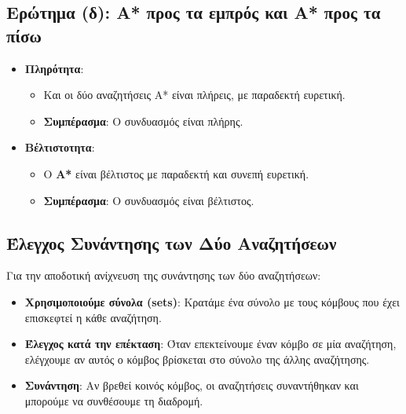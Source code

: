 \documentclass{article}
\begin{document}
\subsection*{Ερώτημα (δ): A* προς τα εμπρός και A* προς τα πίσω}

\begin{itemize}
    \item \textbf{Πληρότητα}:
    \begin{itemize}
        \item Και οι δύο αναζητήσεις A* είναι πλήρεις, με παραδεκτή ευρετική.
        \item \textbf{Συμπέρασμα}: Ο συνδυασμός είναι πλήρης.
    \end{itemize}
    \item \textbf{Βέλτιστοτητα}:
    \begin{itemize}
        \item Ο \textbf{A*} είναι βέλτιστος με παραδεκτή και συνεπή ευρετική.
        \item \textbf{Συμπέρασμα}: Ο συνδυασμός είναι βέλτιστος.
    \end{itemize}
\end{itemize}

\subsection*{Έλεγχος Συνάντησης των Δύο Αναζητήσεων}

Για την αποδοτική ανίχνευση της συνάντησης των δύο αναζητήσεων:
\begin{itemize}
    \item \textbf{Χρησιμοποιούμε σύνολα (sets)}: Κρατάμε ένα σύνολο με τους κόμβους που έχει επισκεφτεί η κάθε αναζήτηση.
    \item \textbf{Έλεγχος κατά την επέκταση}: Όταν επεκτείνουμε έναν κόμβο σε μία αναζήτηση, ελέγχουμε αν αυτός ο κόμβος βρίσκεται στο σύνολο της άλλης αναζήτησης.
    \item \textbf{Συνάντηση}: Αν βρεθεί κοινός κόμβος, οι αναζητήσεις συναντήθηκαν και μπορούμε να συνθέσουμε τη διαδρομή.
\end{itemize}
\end{document}
